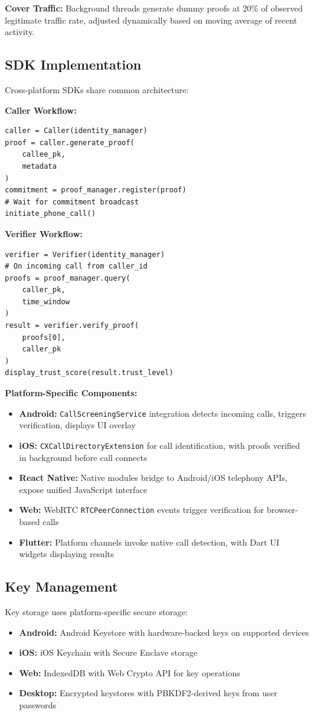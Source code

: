 \documentclass[11pt,twocolumn]{article}
\begin{document}
\textbf{Cover Traffic:} Background threads generate dummy proofs at 20\% of observed legitimate traffic rate, adjusted dynamically based on moving average of recent activity.

\subsection{SDK Implementation}

Cross-platform SDKs share common architecture:

\textbf{Caller Workflow:}
\begin{verbatim}
caller = Caller(identity_manager)
proof = caller.generate_proof(
    callee_pk,
    metadata
)
commitment = proof_manager.register(proof)
# Wait for commitment broadcast
initiate_phone_call()
\end{verbatim}

\textbf{Verifier Workflow:}
\begin{verbatim}
verifier = Verifier(identity_manager)
# On incoming call from caller_id
proofs = proof_manager.query(
    caller_pk,
    time_window
)
result = verifier.verify_proof(
    proofs[0],
    caller_pk
)
display_trust_score(result.trust_level)
\end{verbatim}

\textbf{Platform-Specific Components:}
\begin{itemize}
\item \textbf{Android:} \texttt{CallScreeningService} integration detects incoming calls, triggers verification, displays UI overlay
\item \textbf{iOS:} \texttt{CXCallDirectoryExtension} for call identification, with proofs verified in background before call connects
\item \textbf{React Native:} Native modules bridge to Android/iOS telephony APIs, expose unified JavaScript interface
\item \textbf{Web:} WebRTC \texttt{RTCPeerConnection} events trigger verification for browser-based calls
\item \textbf{Flutter:} Platform channels invoke native call detection, with Dart UI widgets displaying results
\end{itemize}

\subsection{Key Management}

Key storage uses platform-specific secure storage:
\begin{itemize}
\item \textbf{Android:} Android Keystore with hardware-backed keys on supported devices
\item \textbf{iOS:} iOS Keychain with Secure Enclave storage
\item \textbf{Web:} IndexedDB with Web Crypto API for key operations
\item \textbf{Desktop:} Encrypted keystores with PBKDF2-derived keys from user passwords
\end{itemize}
\end{document}
